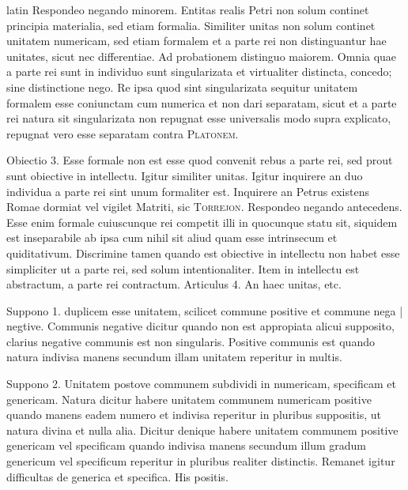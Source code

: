 \begin{otherlanguage*}{latin}
\pstart
 Respondeo negando minorem. Entitas realis Petri non solum continet principia materialia, sed etiam formalia. Similiter unitas non solum continet unitatem numericam, sed etiam formalem et a parte rei non distinguantur hae unitates, sicut nec differentiae. Ad probationem distinguo maiorem. Omnia quae a parte rei sunt in individuo sunt singularizata et virtualiter distincta, concedo; sine distinctione nego. Re ipsa quod sint singularizata sequitur unitatem formalem esse coniunctam cum numerica et non dari separatam, sicut et a parte rei natura sit singularizata non repugnat esse universalis modo supra explicato, repugnat vero esse separatam contra \textsc{Platonem}. 
\pend

\pstart
 Obiectio 3. Esse formale non est esse quod convenit rebus a parte rei, sed prout sunt obiective in intellectu. Igitur similiter unitas. Igitur inquirere an duo individua a parte rei sint unum formaliter est. Inquirere an Petrus existens Romae dormiat vel vigilet Matriti, sic \textsc{Torrejon}. Respondeo negando antecedens. Esse enim formale cuiuscunque rei competit illi in quocunque statu sit, siquidem est inseparabile ab ipsa cum nihil sit aliud quam esse intrinsecum et quiditativum. Discrimine tamen quando est obiective in intellectu non habet esse simpliciter ut a parte rei, sed solum intentionaliter. Item in intellectu est abstractum, a parte rei contractum. Articulus 4. An haec unitas, etc. 
\pend

        \pstart
        \pend
      
\pstart
 Suppono 1.  duplicem esse unitatem, scilicet commune positive et commune nega \textnormal{|}   negtive. Communis negative dicitur quando non est appropiata alicui supposito, clarius negative communis est non singularis. Positive communis est quando natura indivisa manens secundum illam unitatem reperitur in multis. 
\pend

\pstart
 Suppono 2. Unitatem postove communem subdividi in numericam, specificam et genericam. Natura dicitur habere unitatem communem numericam positive quando manens eadem numero et indivisa reperitur in pluribus suppositis, ut natura divina et nulla alia. Dicitur denique habere unitatem communem positive genericam vel specificam quando indivisa manens secundum illum gradum genericum vel specificum reperitur in pluribus realiter distinctis. Remanet igitur difficultas de generica et specifica. His positis. 
\pend


\end{otherlanguage*}
